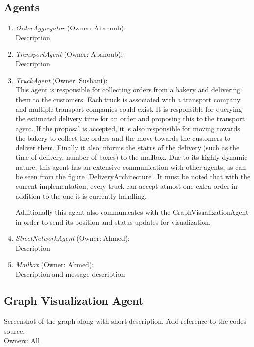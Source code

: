 \documentclass[11pt, a4paper]{article}
\begin{document}
\subsection{Agents}\label{DeliveryAgents}
\begin{enumerate}
	\item \textit{OrderAggregator} (Owner: Abanoub):\\
	Description
	\item \textit{TransportAgent} (Owner: Abanoub):\\
	Description
	\item \textit{TruckAgent} (Owner: Sushant):\\
	This agent is responsible for collecting orders from a bakery and delivering them to the customers. Each truck is associated with a transport company and multiple transport companies could exist. It is responsible for querying the estimated delivery time for an order and proposing this to the transport agent. If the proposal is accepted, it is also responsible for moving towards the bakery to collect the orders and the move towards the customers to deliver them. Finally it also informs the status of the delivery (such as the time of delivery, number of boxes) to the mailbox. Due to its highly dynamic nature, this agent has an extensive communication with other agents, as can be seen from the figure \ref{DeliveryArchitecture}. It must be noted that with the current implementation, every truck can accept atmost one extra order in addition to the one it is currently handling. 
	
	Additionally this agent also communicates with the GraphVisualizationAgent in order to send its position and status updates for visualization. 
	\item \textit{StreetNetworkAgent} (Owner: Ahmed):\\
	Description
	\item \textit{Mailbox} (Owner: Ahmed):\\
	Description and message description
\end{enumerate}

\newpage
\subsection{Graph Visualization Agent}\label{GraphVisualizationAgent}
Screenshot of the graph along with short description. Add reference to the codes source. 
\\Owners: All
\end{document}
